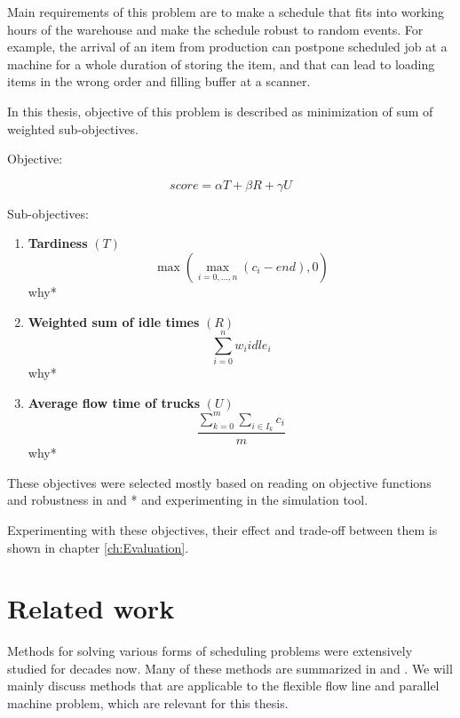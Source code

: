 \documentclass{ctuthesis}
\begin{document}
Main requirements of this problem are to make a schedule that fits into working hours of the warehouse and make the schedule robust to random events. For example, the arrival of an item from production can postpone scheduled job at a machine for a whole duration of storing the item, and that can lead to loading items in the wrong order and filling buffer at a scanner. 

In this thesis, objective of this problem is described as minimization of sum of weighted sub-objectives.

Objective:

\begin{equation}
    score = \alpha T + \beta R + \gamma  U
\end{equation}

Sub-objectives:

\begin{enumerate}
\item \textbf{Tardiness} $(T)$\\ \begin{equation}\max(\max_{i=0,\ldots,n}( c_i - end), 0)\end{equation}
why*
\item \textbf{Weighted sum of idle times} $(R)$\\ 
\begin{equation}
    \sum_{i=0}^{n} w_iidle_i
\end{equation}
why*
\item \textbf{Average flow time of trucks} $(U)$
\begin{equation} 
    \dfrac{\sum_{k=0}^{m} \sum_{i \in I_k} c_i}{m}
\end{equation}
why*
\end{enumerate}

 These objectives were selected mostly based on reading on objective functions and robustness in \cite{pinedo} and \cite{tkindt}* and experimenting in the simulation tool. 
 
 Experimenting with these objectives, their effect and trade-off between them is shown in chapter \ref{ch:Evaluation}.

\chapter{Related work}
\label{chap:Related work}
Methods for solving various forms of scheduling problems were extensively studied for decades now. Many of these methods are summarized in \cite{pinedo} and \cite{bucker}. We will mainly discuss methods that are applicable to the flexible flow line and parallel machine problem, which are relevant for this thesis. 
\end{document}
